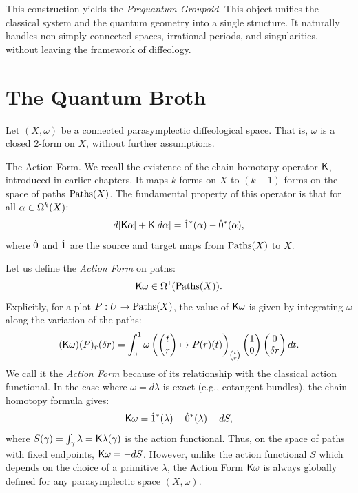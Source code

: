 This construction yields the \emph{Prequantum Groupoid}.
This object unifies the classical system and the quantum geometry into a single structure.
It naturally handles non-simply connected spaces,
irrational periods,
and singularities,
without leaving the framework of diffeology.

\section{The Quantum Broth}

Let $(X,\omega)$ be a connected parasymplectic diffeological space.
That is,
$\omega$ is a closed $2$-form on $X$,
without further assumptions.

\begin{Article}{The Action Form.}{}
  We recall the existence of the chain-homotopy operator $\mathsf{K}$,
  introduced in earlier chapters.
  It maps $k$-forms on $X$ to $(k-1)$-forms on the space of paths $\operatorname{Paths}(X)$.
  The fundamental property of this operator is that for all $\alpha \in \Omega^k(X)$:
  $$%
    d[\CHO\alpha] + \CHO[d\alpha] = \1^*(\alpha) - \0^*(\alpha),
  $$%
  where $\hat 0$ and $\hat 1$ are the source and target maps from $\operatorname{Paths}(X)$ to $X$.

  Let us define the \emph{Action Form} on paths:
  $$%
    \Komega \in \DForms^1(\Paths(X)).
  $$%
  Explicitly,
  for a plot $P : U \to \operatorname{Paths}(X)$,
  the value of $\mathsf{K}\omega$ is given by integrating $\omega$ along the variation of the paths:
  $$%
    (\Komega)(P)_r(\delta r) = \int_0^1 \omega \left( \Vector{t \\ r} \mapsto P(r)(t) \right)_{t \choose r} \Vector{1 \\ 0} \Vector{0 \\ \delta r} dt.
  $$%
  We call it the \emph{Action Form} because of its relationship with the classical action functional.
  In the case where $\omega = d\lambda$ is exact (e.g., cotangent bundles),
  the chain-homotopy formula gives:
  $$
    \mathsf{K}\omega = \hat 1^*(\lambda) - \hat 0^*(\lambda) - dS,
  $$
  where $S(\gamma) = \int_\gamma \lambda = \mathsf{K}\lambda(\gamma)$ is the action functional.
  Thus,
  on the space of paths with fixed endpoints,
  $\mathsf{K}\omega = -dS$.
  However,
  unlike the action functional $S$ which depends on the choice of a primitive $\lambda$,
  the Action Form $\mathsf{K}\omega$ is always globally defined for any parasymplectic space $(X,\omega)$.

\end{Article}

